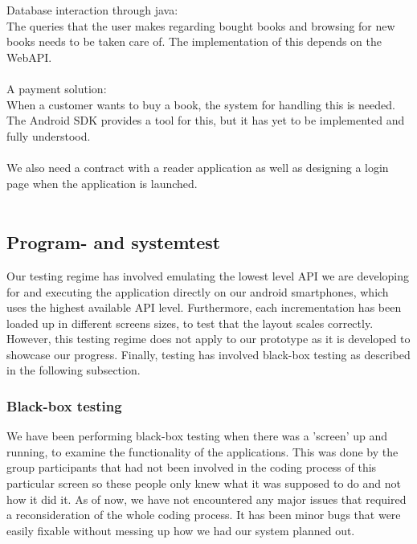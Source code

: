 \documentclass[12pt]{article}
\begin{document}
Database interaction through java:\\
The queries that the user makes regarding bought books and browsing for new books needs to be taken care of. The implementation of this depends on the WebAPI.\\
\\
A payment solution:\\
When a customer wants to buy a book, the system for handling this is needed. The Android SDK provides a tool for this, but it has yet to be implemented and fully understood.\\
\\
We also need a contract with a reader application as well as designing a login page when the application is launched.
\\\\
\newpage
\subsection{Program- and systemtest}

Our testing regime has involved emulating the lowest level API we are developing for and executing the application directly on our android smartphones, which uses the highest available API level. Furthermore, each incrementation has been loaded up in different screens sizes, to test that the layout scales correctly. However, this testing regime does not apply to our prototype as it is developed to showcase our progress. Finally, testing has involved black-box testing as described in the following subsection.

\subsubsection{Black-box testing}
We have been performing black-box testing when there was a 'screen' up and running, to examine the functionality of the applications. This was done by the group participants that had not been involved in the coding process of this particular screen so these people only knew what it was supposed to do and not how it did it. As of now, we have not encountered any major issues that required a reconsideration of the whole coding process. It has been minor bugs that were easily fixable without messing up how we had our system planned out.
\end{document}
